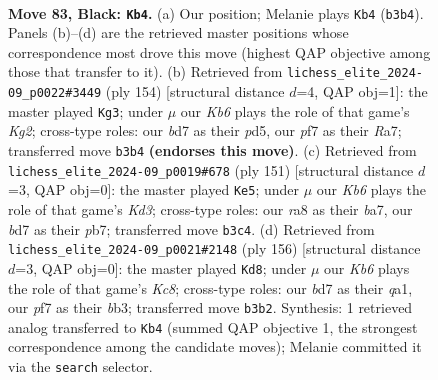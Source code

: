\documentclass[11pt]{article}
\begin{document}
\clearpage

\begin{figure}[p]\centering
\begin{subfigure}{0.46\textwidth}\centering
\resizebox{\linewidth}{!}{%
\newchessgame
\chessboard[
  setfen={R7/3B1P2/8/8/7P/1k6/8/7K b - - 10 83},
  showmover=false,
  pgfstyle=straightmove, color=movearrow, markmove={b3-b4}
]}
\caption{}
\end{subfigure}\hfill
\begin{subfigure}{0.46\textwidth}\centering
\resizebox{\linewidth}{!}{%
\newchessgame
\chessboard[
  setfen={8/R7/8/3p4/8/3k4/6K1/2r5 w - - 41 78},
  showmover=false,
  pgfstyle=straightmove, color=movearrow, markmove={g2-g3}
]}
\caption{}
\end{subfigure}
\\[4pt]
\begin{subfigure}{0.46\textwidth}\centering
\resizebox{\linewidth}{!}{%
\newchessgame
\chessboard[
  setfen={8/BP3K2/3k4/8/p7/P7/8/8 b - - 2 76},
  showmover=false,
  pgfstyle=straightmove, color=movearrow, markmove={d6-e5}
]}
\caption{}
\end{subfigure}\hfill
\begin{subfigure}{0.46\textwidth}\centering
\resizebox{\linewidth}{!}{%
\newchessgame
\chessboard[
  setfen={2K5/8/2k5/8/5p1p/1b6/8/q7 w - - 0 79},
  showmover=false,
  pgfstyle=straightmove, color=movearrow, markmove={c8-d8}
]}
\caption{}
\end{subfigure}
\caption{\textbf{Move 83, Black: \texttt{Kb4}.} (a) Our position; Melanie plays \texttt{Kb4} (\texttt{b3b4}). Panels (b)--(d) are the retrieved master positions whose correspondence most drove this move (highest QAP objective among those that transfer to it). (b) Retrieved from \texttt{lichess\_elite\_2024-09\_p0022\#3449} (ply 154) [structural distance $d$=4, QAP obj=1]: the master played \texttt{Kg3}; under $\mu$ our \emph{Kb6} plays the role of that game's \emph{Kg2}; cross-type roles: our \emph{b}d7 as their \emph{p}d5, our \emph{p}f7 as their \emph{R}a7; transferred move \texttt{b3b4} \textbf{(endorses this move)}. (c) Retrieved from \texttt{lichess\_elite\_2024-09\_p0019\#678} (ply 151) [structural distance $d$=3, QAP obj=0]: the master played \texttt{Ke5}; under $\mu$ our \emph{Kb6} plays the role of that game's \emph{Kd3}; cross-type roles: our \emph{r}a8 as their \emph{b}a7, our \emph{b}d7 as their \emph{p}b7; transferred move \texttt{b3c4}. (d) Retrieved from \texttt{lichess\_elite\_2024-09\_p0021\#2148} (ply 156) [structural distance $d$=3, QAP obj=0]: the master played \texttt{Kd8}; under $\mu$ our \emph{Kb6} plays the role of that game's \emph{Kc8}; cross-type roles: our \emph{b}d7 as their \emph{q}a1, our \emph{p}f7 as their \emph{b}b3; transferred move \texttt{b3b2}. Synthesis: 1 retrieved analog transferred to \texttt{Kb4} (summed QAP objective 1, the strongest correspondence among the candidate moves); Melanie committed it via the \texttt{search} selector.}
\label{fig:thought-m165}
\end{figure}
\end{document}
